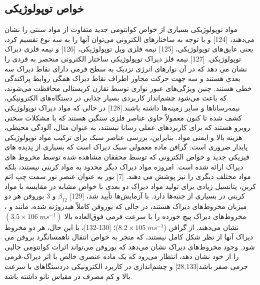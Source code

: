\subsection{خواص توپولوژیکی}
مواد توپولوژیکی بسیاری از خواص کوانتومی جدید متفاوت از مواد سنتی را نشان می‌دهند، \cite{qiTopologicalInsulatorsSuperconductors2011}[124] و با توجه به ساختارهای الکترونی می‌توان آنها را به سه نوع تقسیم کرد، یعنی عایق‌های توپولوژیکی، \cite{hsiehTopologicalCrystallineInsulators2013}[125] نیمه فلزی ویل توپولوژیکی، \cite{xuDiscoveryWeylFermion2015}[126] و نیمه فلزی دیراک توپولوژیکی. \cite{wanTopologicalSemimetalFermiarc2011}[127] نیمه فلز دیراک توپولوژیکی ساختار الکترونی منحصر به فردی را نشان می دهد که در آن نوارهای انرژی نزدیک به سطح فرمی دارای نقاط دیراک سه بعدی هستند و سه جهت حرکت مجاور اطراف نقاط دیراک همگی روابط پراکندگی خطی هستند. چنین ویژگی‌های عبور نواری توسط تقارن کریستالی محافظت می‌شوند، که باعث می‌شود چشم‌انداز کاربردی بسیار جذابی در دستگاه‌های الکترونیکی، نیمه‌رساناها و سایر زمینه‌ها داشته باشند.\cite{zhaoPalgraphynePromising2D2020}[128] در حالی که مواد دیراک توپولوژیکی کشف شده تا کنون معمولاً حاوی عناصر فلزی سنگین هستند که با مشکلات سختی روبرو هستند که برای کاربردهای عملی رسانا نیستند، به عنوان مثال، آلودگی محیطی، هزینه بالا و ایمنی مواد. بنابراین، بررسی عناصر سبک برای ترکیب مواد توپولوژیکی پایدار ضروری است. گرافن ماده معمولی سبک دیراک است که بسیاری از پدیده های فیزیکی جدید و خواص الکترونی که توسط محققان مشاهده شده توسط مخروط های دیراک ارائه شده است. امروزه مواد دیراک دیگر محدود به مواد کربنی نیستند، بلکه مواد مختلف دیگری را نیز پوشش می دهند. [7] بور به عنوان عنصر نور سمت چپ اتم کربن، پتانسیل زیادی برای تولید مواد دیراک دو بعدی با خواص مشابه در مقایسه با مواد کربنی در بسیاری از جنبه‌ها دارد. با آزمایش‌ها تأیید شد، \cite{fengDiracFermionsBorophene2017}[129] $\beta_{12}$ و 3 بوروفن هر دو میزبان مخروط‌های دیراک هستند، در حالی که بوروفن کاملاً هیدروژنه شده، مانند  و ، مخروط‌های دیراک پیچ خورده را با سرعت فرمی فوق‌العاده بالا $(3.5 \times 106\; m s^{-1})$ نشان می‌دهند. از گرافن ($8.2\times 105\; m s^{-1}$)؛ \cite{xuHydrogenatedBoropheneStable2016, hwangFermiVelocityEngineering2012, trevisanuttoInitioGWManyBody2008}[130-132]، با این حال، هر دو مخروط دیراک آنها از نظر شکل کامل نیستند، که منجر به خواص انتقال ناهمسانگرد بروفن می شود. وجود مخروط‌های دیراک نشان می‌دهد که بوروفن می‌تواند اثرات کوانتومی جالبی را از خود نشان دهد، انتظار می‌رود که یک ماده عنصری خالص با اثر دیراک-فرمی جرمی صفر باشد\cite{malkoCompetitionGrapheneGraphynes2012, zhouSemimetallicTwoDimensionalBoron2014}[28,133] و چشم‌اندازی در کاربرد الکترونیکی دردستگاهای با سرعت بالا و کم مصرف در مقیاس نانو داشته باشد.

